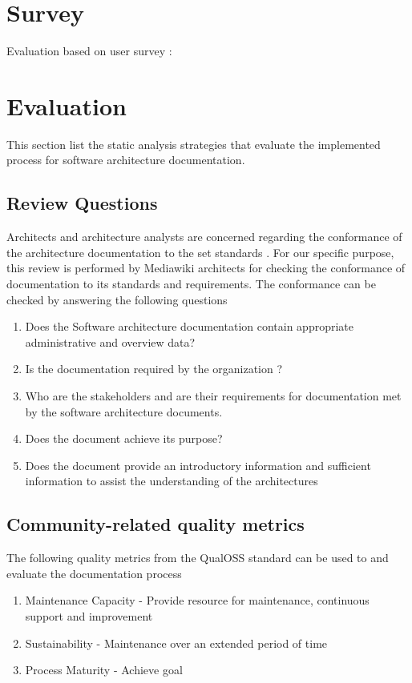 \section{Survey}

Evaluation based on user survey :


\section{Evaluation }
This section list the static analysis strategies that evaluate the implemented process for software architecture documentation.
\subsection{Review Questions}
\indent Architects and architecture analysts are concerned regarding the conformance of the architecture documentation to the set standards \cite{BachmannDocumentingSoftware2010}. For our specific purpose, this review is performed by Mediawiki architects for checking the conformance of documentation to its standards and requirements. The conformance can be checked by answering the following questions\cite{BachmannDocumentingSoftware2010}
\begin{enumerate}
\item Does the Software architecture documentation contain appropriate administrative and overview data?
\item Is the documentation required by the organization ?
\item Who are the stakeholders and are their requirements for documentation met by the software architecture documents.
\item Does the document achieve its purpose?
\item Does the document provide an introductory information and sufficient information to assist the understanding of the architectures
\end{enumerate}
\subsection{Community-related quality metrics} 
The following quality metrics from the QualOSS standard can be used to and evaluate the documentation process \cite{5314237}
\begin{enumerate}
\item Maintenance Capacity - Provide resource for maintenance, continuous support and improvement
\item Sustainability - Maintenance over an extended period of time
\item Process Maturity - Achieve goal
\end{enumerate}

